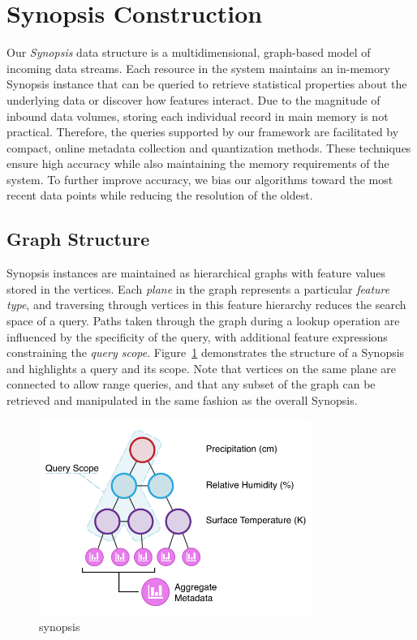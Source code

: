 \section{Synopsis Construction}
\label{sec:synopsis}
Our \emph{Synopsis} data structure is a multidimensional, graph-based model of incoming data streams. Each resource in the system maintains an in-memory Synopsis instance that can be queried to retrieve statistical properties about the underlying data or discover how features interact. Due to the magnitude of inbound data volumes, storing each individual record in main memory is not practical. Therefore, the queries supported by our framework are facilitated by compact, online metadata collection and quantization methods. These techniques ensure high accuracy while also maintaining the memory requirements of the system. To further improve accuracy, we bias our algorithms toward the most recent data points while reducing the resolution of the oldest.

\subsection{Graph Structure}
Synopsis instances are maintained as hierarchical graphs with feature values stored in the vertices. Each \emph{plane} in the graph represents a particular \emph{feature type}, and traversing through vertices in this feature hierarchy reduces the search space of a query. Paths taken through the graph during a lookup operation are influenced by the specificity of the query, with additional feature expressions constraining the \emph{query scope}. Figure~\ref{fig:synopsis} demonstrates the structure of a Synopsis and highlights a query and its scope. Note that vertices on the same plane are connected to allow range queries, and that any subset of the graph can be retrieved and manipulated in the same fashion as the overall Synopsis.

\begin{figure}
    \centerline{\includegraphics[width=3.5in]{figures/synopsis.pdf}}
    \caption{synopsis}
    \label{fig:synopsis}
\end{figure}

